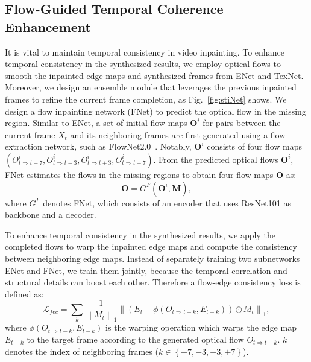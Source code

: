 \subsection{Flow-Guided Temporal Coherence Enhancement}
\label{sec:fec}
It is vital to maintain temporal consistency in video inpainting.
To enhance temporal consistency in the synthesized results, we employ optical flows to smooth the inpainted edge maps and synthesized frames from ENet and TexNet.
Moreover, we design an ensemble module that leverages the previous inpainted frames to refine the current frame completion, as Fig.~\ref{fig:stiNet} shows. 
%
We design a flow inpainting network (FNet) to predict the optical flow in the missing region.
%
Similar to ENet, a set of initial flow maps \(\boldsymbol{O}^i\) for pairs between the current frame $X_t$ and its neighboring frames are first generated using a flow extraction network, such as FlowNet2.0~\cite{Flownet_2017_CVPR}.
Notably, \(\boldsymbol{O}^i\) consists of four flow maps \((O^i_{t\Rightarrow t-7}, O^i_{t\Rightarrow t-3}, O^i_{t\Rightarrow t+3}, O^i_{t\Rightarrow t+7})\).
From the predicted optical flows $\boldsymbol{O}^i$, FNet estimates the flows in the missing regions to obtain four flow maps \(\boldsymbol{O}\) as:
\begin{equation}
	\label{eq:flownet}
	\boldsymbol{O}=G^F(\boldsymbol{O}^{i},\boldsymbol{M}),
\end{equation}
where $G^F$ denotes FNet, which consists of an encoder that uses ResNet101 \cite{He_2016_CVPR} as backbone and a decoder.



To enhance temporal consistency in the synthesized results, we apply the completed flows to warp the inpainted edge maps and compute the consistency between neighboring edge maps. 
%
Instead of separately training two subnetworks ENet and FNet, we train them jointly, because the temporal correlation and structural details can boost each other. 
Therefore a flow-edge consistency loss is defined as:
%
\begin{equation}
	\label{eq:flow_edge}
	\mathcal{L}_{fec}=\sum_{k}\frac{1}{\left\|M_{t} \right\|_1}\left\|(E_{t}-\phi(O_{t\Rightarrow t-k},E_{t-k}))\odot M_{t}\right\|_1,
\end{equation}
where $\phi(O_{t\Rightarrow t-k},E_{t-k})$ is the warping operation which warps the edge map $E_{t-k}$ to the target frame according to the generated optical flow $O_{t\Rightarrow t-k}$.
$k$ denotes the index of neighboring frames ($k\in \left\{-7,-3,+3,+7 \right\}$). 



